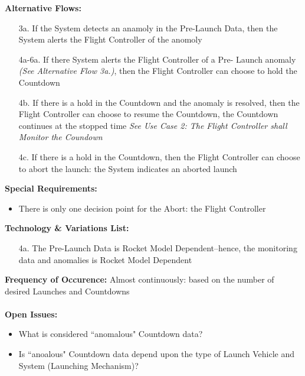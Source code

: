 \documentclass[letterpaper]{article}
\begin{document}
\textbf{Alternative Flows:}
\begin{itemize}
\item[3a.]If the System detects an anamoly in the Pre-Launch Data,
then the System alerts the Flight Controller of the anomoly
\item[4a-6a.]If there System alerts the Flight Controller of a Pre-
Launch anomaly \textit{(See Alternative Flow 3a.)}, then the Flight
Controller can choose to hold the Countdown
\item[4b.]If there is a hold in the Countdown and the anomaly is
resolved, then the Flight Controller can choose to resume the
Countdown, the Countdown continues at the stopped time \textit{See
Use Case 2:  The Flight Controller shall Monitor the Coundown}
\item[4c.]If there is a hold in the Countdown, then the Flight
Controller can choose to abort the launch:  the System indicates an
aborted launch
\end{itemize}
\textbf{Special Requirements:}
\begin{itemize}
\item There is only one decision point for the Abort:  the Flight
Controller
\end{itemize}
\textbf{Technology \& Variations List:}
\begin{itemize}
\item [4a.]The Pre-Launch Data is Rocket Model Dependent--hence,
the monitoring data and anomalies is Rocket Model Dependent
\end{itemize}
\textbf{Frequency of Occurence:  }Almost continuously:  based on the
number of desired Launches and Countdowns\\\\
\textbf{Open Issues:}
\begin{itemize}
\item What is considered ``anomalous" Countdown data?
\item Is ``anoalous" Countdown data depend upon the type of Launch
Vehicle and System (Launching Mechanism)?
\end{itemize}
\end{document}
